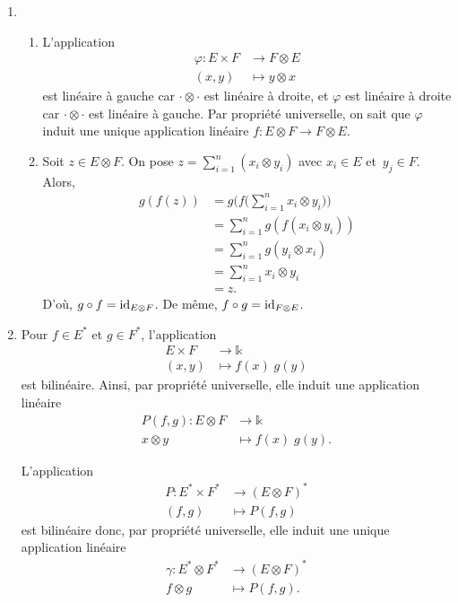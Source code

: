 \documentclass[./main]{subfiles}
\begin{document}
  \begin{enumerate}
    \item \begin{enumerate}
        \item L'application \begin{align*}
          \varphi: E \times F &\longrightarrow F \otimes E \\
          (x,y) &\longmapsto y \otimes x
        \end{align*}
        est linéaire à gauche car $\cdot \otimes \cdot$ est linéaire à droite, et $\varphi$ est linéaire à droite car  $\cdot \otimes \cdot $ est linéaire à gauche.
        Par propriété universelle, on sait que $\varphi$ induit une unique application linéaire  $f : E \otimes F \to F \otimes E$.
      \item Soit $z \in E \otimes F$.
        On pose $z = \sum_{i = 1}^n (x_i \otimes y_i)$ avec $x_i \in E$ et~$y_j \in F$.
        Alors,
        \begin{align*}
          g(f(z)) &= g\Big(f\Big(\sum_{i=1}^n x_i \otimes y_i\Big)\Big)\\
          &= \sum_{i=1}^n g(f(x_i\otimes y_i)) \\
          &= \sum_{i=1}^n g(y_i \otimes x_i) \\
          &= \sum_{i=1}^n x_i \otimes y_i \\
          &= z
        .\end{align*}
        D'où, $g \circ f = \operatorname{id}_{E \otimes F}$.
        De même, $f \circ g = \operatorname{id}_{F \otimes E}$.
      \end{enumerate}
    \item Pour $f \in E^*$ et $g \in F^*$, l'application \begin{align*}
        E \times F &\longrightarrow \mathds{k} \\
        (x,y) &\longmapsto f(x) \; g(y)
      \end{align*} est bilinéaire.
      Ainsi, par propriété universelle, elle induit une application linéaire \begin{align*}
        P(f,g): E \otimes F &\longrightarrow \mathds{k} \\
        x\otimes y &\longmapsto f(x) \; g(y)
      .\end{align*}

      L'application \begin{align*}
        P: E^* \times F^* &\longrightarrow (E \otimes F)^* \\
        (f,g) &\longmapsto P(f,g)
      \end{align*} est bilinéaire donc, par propriété universelle, elle induit une unique application linéaire 
      \begin{align*}
        \gamma:E^* \otimes F^*  &\longrightarrow (E \otimes F)^* \\
        f \otimes g &\longmapsto P(f,g)
      .\end{align*}


\end{enumerate}
\end{document}
